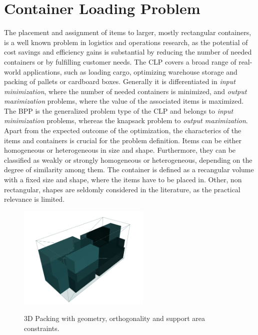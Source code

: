 \section{Container Loading Problem}
\label{sec:clp_definition}

The placement and assignment of items to larger, mostly rectangular
containers, is a well known problem in logistics and operations research, as the
potential of cost savings and efficiency gains is substantial by reducing the number
of needed containers or by fulfilling customer needs. The \gls{CLP} covers a broad range of real-world applications,
such as loading cargo, optimizing warehouse storage and packing of pallets or cardboard boxes.
Generally it is differentiated in \textit{input minimization},
where the number of needed containers is minimized, and \textit{output maximization} problems,
where the value of the associated items is maximized. The \gls{BPP} is the generalized problem type of the \gls{CLP}
and belongs to \textit{input minimization} problems, whereas the knapsack problem to \textit{output maximization}. Apart from the expected outcome of the optimization,
the characterics of the items and containers is crucial for the problem definition. Items can be either
homogeneous or heterogeneous in size and shape. Furthermore, they can be classified as weakly or strongly
homogeneous or heterogeneous, depending on the degree of similarity among them. The container is
defined as a recangular volume with a fixed size and shape, where the items have to be placed in.
Other, non rectangular, shapes are seldomly considered in the literature, as the practical relevance is
limited.
\begin{figure}
    \begin{center}
        \centering
        \vspace{-25pt}
        \includegraphics[width=6.3cm]{pictures/3l_cvrp_example.png}
        \caption[Visualized 3D packing with loading constraints.]{3D Packing with geometry, orthogonality and support area constraints.\footnotemark}
        \vspace{-25pt}
        \label{fig:solution-visualization}
    \end{center}
\end{figure}
